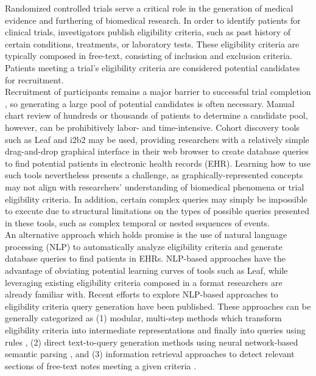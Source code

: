 \documentclass[../main.tex]{subfiles}
\begin{document}
\noindent Randomized controlled trials serve a critical role in the generation of medical evidence and furthering of biomedical research. In order to identify patients for clinical trials, investigators publish eligibility criteria, such as past history of certain conditions, treatments, or laboratory tests. These eligibility criteria are typically composed in free-text, consisting of inclusion and exclusion criteria. Patients meeting a trial's eligibility criteria are considered potential candidates for recruitment. \\

\noindent Recruitment of participants remains a major barrier to successful trial completion \cite{richesson2013electronic}, so generating a large pool of potential candidates is often necessary. Manual chart review of hundreds or thousands of patients to determine a candidate pool, however, can be prohibitively labor- and time-intensive. Cohort discovery tools such as Leaf \cite{dobbins2019leaf} and i2b2 \cite{murphy2010serving} may be used, providing researchers with a relatively simple drag-and-drop graphical interface in their web browser to create database queries to find potential patients in electronic health records (EHR). Learning how to use such tools nevertheless presents a challenge, as graphically-represented concepts may not align with researchers' understanding of biomedical phenomena or trial eligibility criteria. In addition, certain complex queries may simply be impossible to execute due to structural limitations on the types of possible queries presented in these tools, such as complex temporal or nested sequences of events. \\

\noindent An alternative approach which holds promise is the use of natural language processing (NLP) to automatically analyze eligibility criteria and generate database queries to find patients in EHRs. NLP-based approaches have the advantage of obviating potential learning curves of tools such as Leaf, while leveraging existing eligibility criteria composed in a format researchers are already familiar with. Recent efforts to explore NLP-based approaches to eligibility criteria query generation have been published. These approaches can be generally categorized as (1) modular, multi-step methods which transform eligibility criteria into intermediate representations and finally into queries using rules \cite{yuan2019criteria2query, wang2019translate, yu2020}, (2) direct text-to-query generation methods using neural network-based semantic parsing \cite{wang2019translate, yu2020}, and (3) information retrieval approaches to detect relevant sections of free-text notes meeting a given criteria \cite{koopman2016test, liu2020implementation, park2021framework, truong2022ittc}. \\
\end{document}
